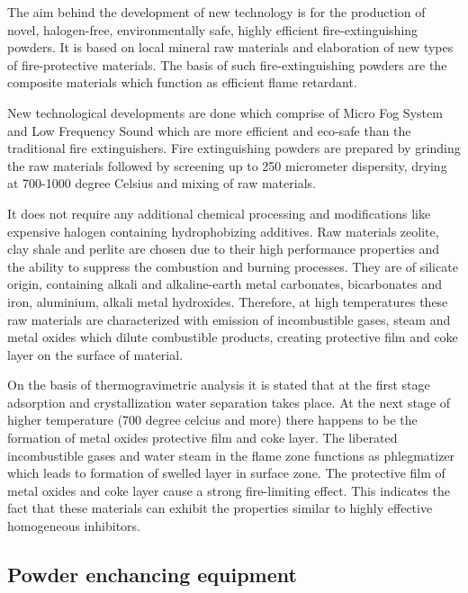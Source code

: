 \documentclass[11pt]{article} %
\begin{document}
\begin{multicols}{2} %
The aim behind the development of new technology is for the production of novel,
halogen-free, environmentally safe, highly efficient fire-extinguishing powders.
It is based on local mineral raw materials and elaboration of new types of
fire-protective materials. The basis of such fire-extinguishing powders are the
composite materials which function as efficient flame retardant.

New technological developments are done which comprise of Micro Fog System and
Low Frequency Sound which are more efficient and eco-safe than the traditional
fire extinguishers. Fire extinguishing powders are prepared by grinding the raw
materials followed by screening up to 250 micrometer dispersity, drying at
700-1000 degree Celsius and mixing of raw materials.

It does not require any additional chemical processing and modifications like
expensive halogen containing hydrophobizing additives. Raw materials zeolite,
clay shale and perlite are chosen due to their high performance properties and
the ability to suppress the combustion and burning processes. They are of
silicate origin, containing alkali and alkaline-earth metal carbonates,
bicarbonates and iron, aluminium, alkali metal hydroxides. Therefore, at high
temperatures these raw materials are characterized with emission of
incombustible gases, steam and metal oxides which dilute combustible products,
creating protective film and coke layer on the surface of material.

On the basis of thermogravimetric analysis it is stated that at the first stage
adsorption and crystallization water separation takes place. At the next stage
of higher temperature (700 degree celcius and more) there happens to be the
formation of metal oxides protective film and coke layer. The liberated
incombustible gases and water steam in the flame zone functions as phlegmatizer
which leads to formation of swelled layer in surface zone. The protective film
of metal oxides and coke layer cause a strong fire-limiting effect. This
indicates the fact that these materials can exhibit the properties similar to
highly effective homogeneous inhibitors.

\subsection*{Powder enchancing equipment}


\end{multicols}
\end{document}
